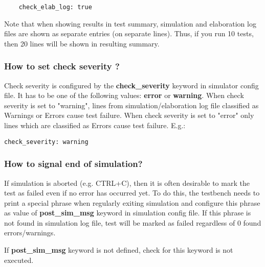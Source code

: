 \documentclass{tropic_design_spec}
\begin{document}
\begin{lstlisting}
    check_elab_log: true
\end{lstlisting}    

Note that when showing results in test summary, simulation and elaboration log files are
shown as separate entries (on separate lines). Thus, if you run 10 tests, then 20 lines
will be shown in resulting summary.


\subsubsection{How to set check severity ?}
\label{sec:how-to-set-check-severity}

Check severity is configured by the \textbf{check_severity} keyword in simulator config file.
It has to be one of the following values: \textbf{error} or \textbf{warning}. When check
severity is set to "warning", lines from simulation/elaboration log file classified as Warnings or
Errors cause test failure. When check severity is set to "error" only lines which are
classified as Errors cause test failure. E.g.:

\begin{lstlisting}
check_severity: warning
\end{lstlisting}


\subsubsection{How to signal end of simulation?}
\label{sec:how-to-signal-end-of-simulation}

If simulation is aborted (e.g. CTRL+C), then it is often desirable to mark the test
as failed even if no error has occurred yet. To do this, the testbench needs to print
a special phrase when regularly exiting simulation and configure this phrase as value
of \textbf{post_sim_msg} keyword in simulation config file. If this phrase is not found
in simulation log file, test will be marked as failed regardless of 0 found errors/warnings.

If \textbf{post_sim_msg} keyword is not defined, check for this keyword is not executed.
\end{document}
